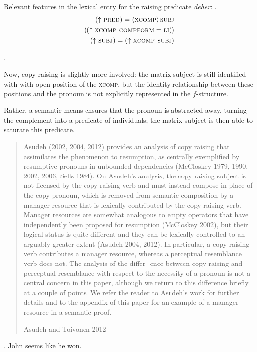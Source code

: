 \documentclass[11pt]{article}
\begin{document}
Relevant features in the lexical entry for the raising predicate \emph{deher}:
\ex.  \begin{align*}
  (\uparrow \textsc{pred}) = \left\langle \textsc{xcomp} \right\rangle \textsc{subj} \\
  ((\uparrow \textsc{xcomp compform} = \textsc{li})) \\
  (\uparrow \textsc{subj}) = (\uparrow \textsc{xcomp subj}) \\
\end{align*}

\ex. 

Now, copy-raising is slightly more involved: the matrix subject is still identified with with open position of the \textsc{xcomp}, but the identity relationship between these positions and the pronoun is not explicitly represented in the \(f\)-structure.

Rather, a semantic means ensures that the pronoun is abstracted away, turning the complement into a predicate of individuals; the matrix subject is then able to saturate this predicate.
\blockquote[Asudeh and Toivonen 2012]{
Asudeh (2002, 2004, 2012) provides an analysis of copy raising that assimilates the phenomenon to resumption, as centrally exemplified by resumptive pronouns in unbounded dependencies (McCloskey 1979, 1990, 2002, 2006; Sells 1984). 
On Asudeh’s analysis, the copy raising subject is not licensed by the copy raising verb and must instead compose in place of the copy pronoun, which is removed from semantic composition by a manager resource that is lexically contributed by the copy raising verb. 
Manager resources are somewhat analogous to empty operators that have independently been proposed for resumption (McCloskey 2002), but their logical status is quite different and they can be lexically controlled to an arguably greater extent (Asudeh 2004, 2012). 
In particular, a copy raising verb contributes a manager resource, whereas a perceptual resemblance verb does not. 
The analysis of the differ- ence between copy raising and perceptual resemblance with respect to the necessity of a pronoun is not a central concern in this paper, although we return to this difference briefly at a couple of points. 
We refer the reader to Asudeh’s work for further details and to the appendix of this paper for an example of a manager resource in a semantic proof.
}
\ex. John seems like he won.
\end{document}
